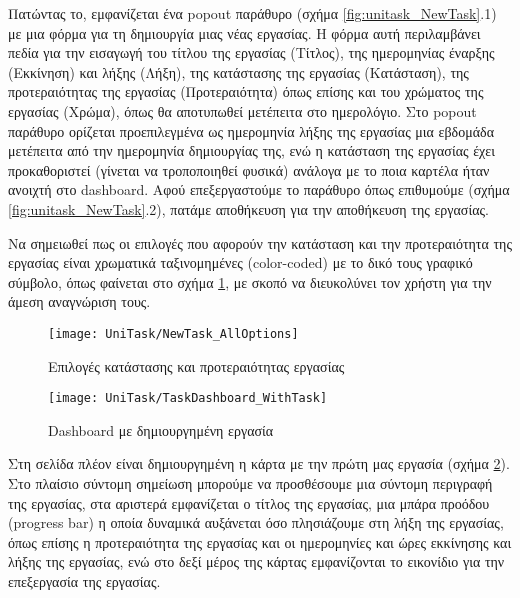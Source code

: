         Πατώντας το, εμφανίζεται ένα popout παράθυρο (σχήμα \ref{fig:unitask_NewTask}.1) με μια φόρμα για τη δημιουργία μιας νέας εργασίας. Η φόρμα αυτή περιλαμβάνει πεδία για την εισαγωγή του τίτλου της εργασίας ({\Zona Τίτλος}), της ημερομηνίας έναρξης ({\Zona Εκκίνηση}) και λήξης ({\Zona Λήξη}), της κατάστασης της εργασίας ({\Zona Κατάσταση}), της προτεραιότητας της εργασίας ({\Zona Προτεραιότητα}) όπως επίσης και του χρώματος της εργασίας ({\Zona Χρώμα}), όπως θα αποτυπωθεί μετέπειτα στο ημερολόγιο. Στο popout παράθυρο ορίζεται προεπιλεγμένα ως ημερομηνία λήξης της εργασίας μια εβδομάδα μετέπειτα από την ημερομηνία δημιουργίας της, ενώ η κατάσταση της εργασίας έχει προκαθοριστεί (γίνεται να τροποποιηθεί φυσικά) ανάλογα με το ποια καρτέλα ήταν ανοιχτή στο dashboard. Αφού επεξεργαστούμε το παράθυρο όπως επιθυμούμε (σχήμα \ref{fig:unitask_NewTask}.2), πατάμε αποθήκευση για την αποθήκευση της εργασίας.

        Να σημειωθεί πως οι επιλογές που αφορούν την κατάσταση και την προτεραιότητα της εργασίας είναι χρωματικά ταξινομημένες (color-coded) με το δικό τους γραφικό σύμβολο, όπως φαίνεται στο σχήμα \ref{fig:unitask_NewTask_AllOptions}, με σκοπό να διευκολύνει τον χρήστη για την άμεση αναγνώριση τους.

        \begin{figure}[h!] \noindent \centering
            \texttt{[image: UniTask/NewTask\_AllOptions]}
            \caption{\centering Επιλογές κατάστασης και προτεραιότητας εργασίας}
            \label{fig:unitask_NewTask_AllOptions}
        \end{figure}

        \begin{figure}[h!] \noindent \centering
            \texttt{[image: UniTask/TaskDashboard\_WithTask]}
            \caption{\centering Dashboard με δημιουργημένη εργασία}
            \label{fig:unitask_TaskDashboard_WithTask}
        \end{figure}

        Στη σελίδα πλέον είναι δημιουργημένη η κάρτα με την πρώτη μας εργασία (σχήμα \ref{fig:unitask_TaskDashboard_WithTask}). Στο πλαίσιο {\Zona σύντομη σημείωση} μπορούμε να προσθέσουμε μια σύντομη περιγραφή της εργασίας, στα αριστερά εμφανίζεται ο τίτλος της εργασίας, μια μπάρα προόδου (progress bar) η οποία δυναμικά αυξάνεται όσο πλησιάζουμε στη λήξη της εργασίας, όπως επίσης η προτεραιότητα της εργασίας και οι ημερομηνίες και ώρες εκκίνησης και λήξης της εργασίας, ενώ στο δεξί μέρος της κάρτας εμφανίζονται το εικονίδιο για την επεξεργασία της εργασίας.


